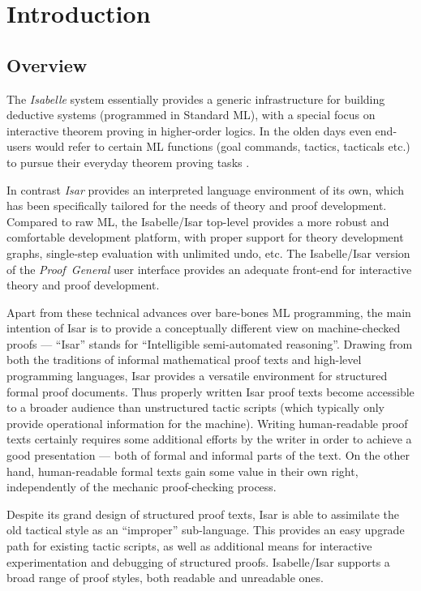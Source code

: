 
\chapter{Introduction}

\section{Overview}

The \emph{Isabelle} system essentially provides a generic infrastructure for
building deductive systems (programmed in Standard ML), with a special focus
on interactive theorem proving in higher-order logics.  In the olden days even
end-users would refer to certain ML functions (goal commands, tactics,
tacticals etc.) to pursue their everyday theorem proving tasks
\cite{isabelle-intro,isabelle-ref}.
  
In contrast \emph{Isar} provides an interpreted language environment of its
own, which has been specifically tailored for the needs of theory and proof
development.  Compared to raw ML, the Isabelle/Isar top-level provides a more
robust and comfortable development platform, with proper support for theory
development graphs, single-step evaluation with unlimited undo, etc.  The
Isabelle/Isar version of the \emph{Proof~General} user interface
\cite{proofgeneral,Aspinall:TACAS:2000} provides an adequate front-end for
interactive theory and proof development.

\medskip Apart from these technical advances over bare-bones ML programming,
the main intention of Isar is to provide a conceptually different view on
machine-checked proofs \cite{Wenzel:1999:TPHOL,Wenzel-PhD} --- ``Isar'' stands
for ``Intelligible semi-automated reasoning''.  Drawing from both the
traditions of informal mathematical proof texts and high-level programming
languages, Isar provides a versatile environment for structured formal proof
documents.  Thus properly written Isar proof texts become accessible to a
broader audience than unstructured tactic scripts (which typically only
provide operational information for the machine).  Writing human-readable
proof texts certainly requires some additional efforts by the writer in order
to achieve a good presentation --- both of formal and informal parts of the
text.  On the other hand, human-readable formal texts gain some value in their
own right, independently of the mechanic proof-checking process.

Despite its grand design of structured proof texts, Isar is able to assimilate
the old tactical style as an ``improper'' sub-language.  This provides an easy
upgrade path for existing tactic scripts, as well as additional means for
interactive experimentation and debugging of structured proofs.  Isabelle/Isar
supports a broad range of proof styles, both readable and unreadable ones.

